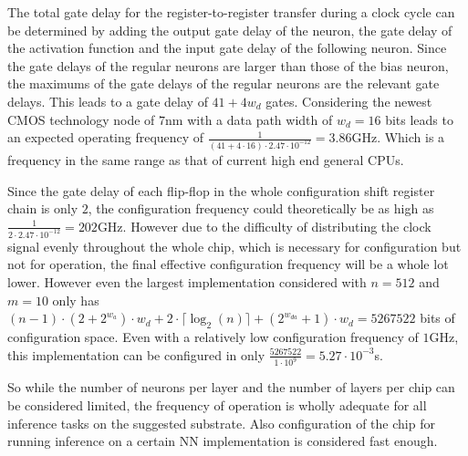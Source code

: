 The total gate delay for the register-to-register transfer during a clock cycle can be determined by adding the output gate delay of the neuron, the gate delay of the activation function and the input gate delay of the following neuron. Since the gate delays of the regular neurons are larger than those of the bias neuron, the maximums of the gate delays of the regular neurons are the relevant gate delays. This leads to a gate delay of $41 + 4w_{d}$ gates. Considering the newest \ac{CMOS} technology node of $7$nm\cite{STILLMAKER201774} with a data path width of $w_{d} = 16$ bits leads to an expected operating frequency of $\frac{1}{(41 + 4 \cdot 16) \cdot 2.47 \cdot 10^{-12}} = 3.86$GHz. Which is a frequency in the same range as that of current high end general \acp{CPU}.

Since the gate delay of each flip-flop in the whole configuration shift register chain is only $2$, the configuration frequency could theoretically be as high as $\frac{1}{2 \cdot 2.47 \cdot 10^{-12}} = 202$GHz. However due to the difficulty of distributing the clock signal evenly throughout the whole chip, which is necessary for configuration but not for operation, the final effective configuration frequency will be a whole lot lower. However even the largest implementation considered with $n = 512$ and $m = 10$ only has $(n - 1) \cdot (2 + 2^{w_{a}}) \cdot w_{d} + 2 \cdot \lceil\log_{2}(n)\rceil + (2^{w_{da}} + 1) \cdot w_{d} = 5267522$ bits of configuration space. Even with a relatively low configuration frequency of $1$GHz, this implementation can be configured in only $\frac{5267522}{1 \cdot 10^{9}} = 5.27 \cdot 10^{-3}$s.

So while the number of neurons per layer and the number of layers per chip can be considered limited, the frequency of operation is wholly adequate for all inference tasks on the suggested substrate. Also configuration of the chip for running inference on a certain \ac{NN} implementation is considered fast enough.
